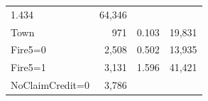 \documentclass[]{book}
\theoremstyle{definition}
\theoremstyle{definition}
\theoremstyle{definition}
\theoremstyle{remark}
\begin{document}
\begin{longtable}[]{@{}lrrr@{}}
\begin{minipage}[t]{0.15\columnwidth}
1.434\strut
\end{minipage} & \begin{minipage}[t]{0.15\columnwidth}\raggedleft\strut
64,346\strut
\end{minipage}\tabularnewline
\begin{minipage}[t]{0.27\columnwidth}\raggedright\strut
Town\strut
\end{minipage} & \begin{minipage}[t]{0.15\columnwidth}\raggedleft\strut
971\strut
\end{minipage} & \begin{minipage}[t]{0.15\columnwidth}\raggedleft\strut
0.103\strut
\end{minipage} & \begin{minipage}[t]{0.15\columnwidth}\raggedleft\strut
19,831\strut
\end{minipage}\tabularnewline
\begin{minipage}[t]{0.27\columnwidth}\raggedright\strut
Fire5=0\strut
\end{minipage} & \begin{minipage}[t]{0.15\columnwidth}\raggedleft\strut
2,508\strut
\end{minipage} & \begin{minipage}[t]{0.15\columnwidth}\raggedleft\strut
0.502\strut
\end{minipage} & \begin{minipage}[t]{0.15\columnwidth}\raggedleft\strut
13,935\strut
\end{minipage}\tabularnewline
\begin{minipage}[t]{0.27\columnwidth}\raggedright\strut
Fire5=1\strut
\end{minipage} & \begin{minipage}[t]{0.15\columnwidth}\raggedleft\strut
3,131\strut
\end{minipage} & \begin{minipage}[t]{0.15\columnwidth}\raggedleft\strut
1.596\strut
\end{minipage} & \begin{minipage}[t]{0.15\columnwidth}\raggedleft\strut
41,421\strut
\end{minipage}\tabularnewline
\begin{minipage}[t]{0.27\columnwidth}\raggedright\strut
NoClaimCredit=0\strut
\end{minipage} & \begin{minipage}[t]{0.15\columnwidth}\raggedleft\strut
3,786\strut
\end{minipage} & \begin{minipage}[t]{0.15\columnwidth}\raggedleft\strut

\end{minipage}
\end{longtable}
\end{document}
